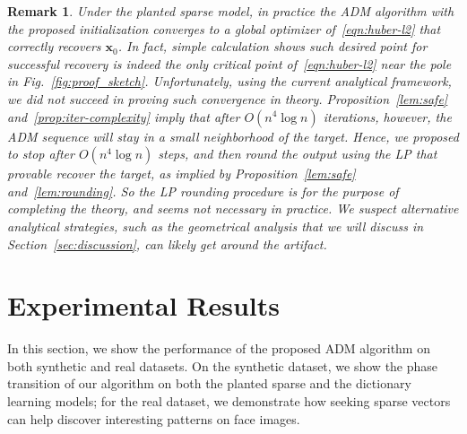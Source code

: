 \documentclass[11pt, journal, final]{IEEEtran}
\numberwithin{equation}{section}
\newtheorem{remark}[theorem]{Remark}
\newcommand{\mb}{\mathbf}
\begin{document}
{\begin{remark}
Under the planted sparse model, in practice the ADM algorithm with the proposed initialization converges to a global optimizer of~\eqref{eqn:huber-l2} that correctly recovers $\mb x_0$. In fact, simple calculation shows such desired point for successful recovery is indeed the only critical point of~\eqref{eqn:huber-l2} near the pole in Fig.~\ref{fig:proof_sketch}.  Unfortunately, using the current analytical framework, we did not succeed in proving such convergence in theory. Proposition~\ref{lem:safe} and~\ref{prop:iter-complexity} imply that after $O(n^4 \log n)$ iterations, however, the ADM sequence will stay in a small neighborhood of the target. Hence, we proposed to stop after $O(n^4 \log n)$ steps, and then round the output using the LP that provable recover the target, as implied by Proposition~\ref{lem:safe} and~\ref{lem:rounding}. So the LP rounding procedure is for the purpose of completing the theory, and seems not necessary in practice. We suspect alternative analytical strategies, such as the geometrical analysis that we will discuss in Section~\ref{sec:discussion}, can likely get around the artifact.
\end{remark}

\section{Experimental Results}\label{sec:exp}

In this section, we show the performance of the proposed ADM algorithm on both synthetic and real datasets. On the synthetic dataset, we show the phase transition of our algorithm on both the planted sparse and the dictionary learning models; for the real dataset, we demonstrate how seeking sparse vectors can help discover interesting patterns on face images.

}
\end{document}
